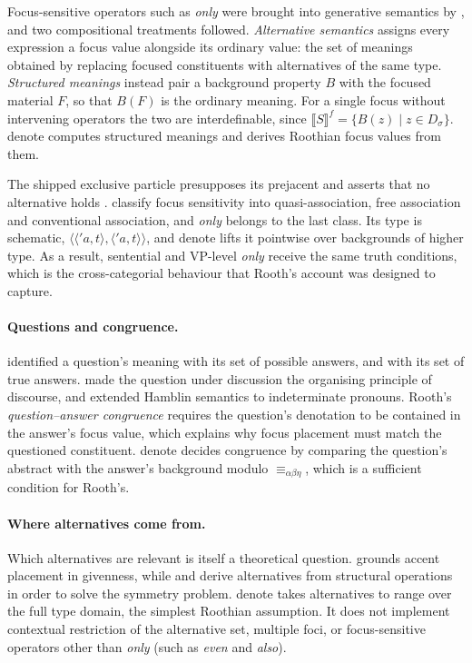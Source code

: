 \documentclass[11pt,a4paper]{article}
\newcommand{\den}[1]{\llbracket #1\rrbracket}
\newcommand{\dn}{\textsf{denote}}
\newcommand{\ty}[1]{\langle #1\rangle}
\theoremstyle{definition}
\begin{document}
Focus-sensitive operators such as \textit{only} were brought into generative semantics by \citet{jackendoff1972}, and two compositional treatments followed. \emph{Alternative semantics} \citep{rooth1985,rooth1992} assigns every expression a focus value alongside its ordinary value: the set of meanings obtained by replacing focused constituents with alternatives of the same type. \emph{Structured meanings} \citep{vonstechow1990,krifka1991} instead pair a background property $B$ with the focused material $F$, so that $B(F)$ is the ordinary meaning. For a single focus without intervening operators the two are interdefinable, since $\den{S}^f=\{B(z)\mid z\in D_\sigma\}$. \dn{} computes structured meanings and derives Roothian focus values from them.

The shipped exclusive particle presupposes its prejacent and asserts that no alternative holds \citep{horn1969}. \citet{beaverclark2008} classify focus sensitivity into quasi-association, free association and conventional association, and \textit{only} belongs to the last class. Its type is schematic, $\ty{\ty{'a,t},\ty{'a,t}}$, and \dn{} lifts it pointwise over backgrounds of higher type. As a result, sentential and VP-level \textit{only} receive the same truth conditions, which is the cross-categorial behaviour that Rooth's account was designed to capture.

\paragraph{Questions and congruence.} \citet{hamblin1973} identified a question's meaning with its set of possible answers, and \citet{karttunen1977} with its set of true answers. \citet{roberts2012} made the question under discussion the organising principle of discourse, and \citet{kratzershimoyama2002} extended Hamblin semantics to indeterminate pronouns. Rooth's \emph{question--answer congruence} requires the question's denotation to be contained in the answer's focus value, which explains why focus placement must match the questioned constituent. \dn{} decides congruence by comparing the question's abstract with the answer's background modulo $\equiv_{\alpha\beta\eta}$, which is a sufficient condition for Rooth's.

\paragraph{Where alternatives come from.} Which alternatives are relevant is itself a theoretical question. \citet{schwarzschild1999} grounds accent placement in givenness, while \citet{katzir2007} and \citet{foxkatzir2011} derive alternatives from structural operations in order to solve the symmetry problem. \dn{} takes alternatives to range over the full type domain, the simplest Roothian assumption. It does not implement contextual restriction of the alternative set, multiple foci, or focus-sensitive operators other than \textit{only} (such as \textit{even} and \textit{also}).
\end{document}
